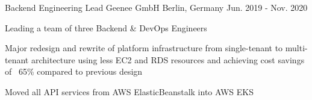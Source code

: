 

\begin{cventries}

  \cventry
    {Backend Engineering Lead} %
    {Geenee GmbH} %
    {Berlin, Germany} %
    {Jun. 2019 - Nov. 2020} %
    {
      \begin{cvitems} %
        \item {Leading a team of three Backend \& DevOps Engineers}
        \begin{cvsubitems}
          \item {Major redesign and rewrite of platform infrastructure from single-tenant to multi-tenant architecture using less EC2 and RDS resources and achieving cost savings of ~65\% compared to previous design}
          \item {Moved all API services from AWS ElasticBeanstalk into AWS EKS}
        \end{cvsubitems}
      \end{cvitems}
    }


\end{cventries}
